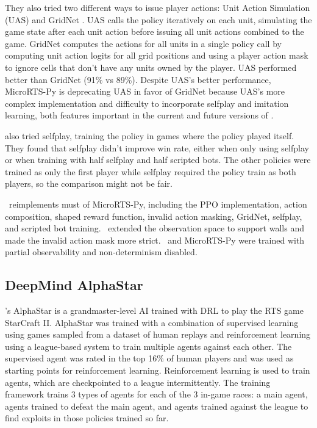 \documentclass{article}
\begin{document}
They also tried two different ways to issue player actions: Unit Action Simulation (UAS)
and GridNet \citep{pmlr-v97-han19a}. UAS calls the policy iteratively on each unit, simulating the game state
after each unit action before issuing all unit actions combined to the game. GridNet
computes the actions for all units in a single policy call by computing unit action
logits for all grid positions and using a player action mask to ignore cells that don't
have any units owned by the player. UAS performed better than GridNet (91\% vs 89\%).
Despite UAS's better performance, MicroRTS-Py is deprecating UAS in favor of GridNet
because UAS's more complex implementation and difficulty to incorporate selfplay and
imitation learning, both features important in the current and future versions of
\agentName.

\citet{DBLP:journals/corr/abs-2105-13807} also tried selfplay, training the policy in
games where the policy played itself. They found that selfplay didn't improve win rate,
either when only using selfplay or when training with half selfplay and half scripted
bots. The other policies were trained as only the first player while selfplay required
the policy train as both players, so the comparison might not be fair.

\agentName\ reimplements must of MicroRTS-Py, including the PPO implementation, action
composition, shaped reward function, invalid action masking, GridNet, selfplay, and
scripted bot training. \agentName\ extended the observation space to support walls and
made the invalid action mask more strict. \agentName\ and MicroRTS-Py were trained with partial
observability and non-determinism disabled.

\subsection{DeepMind AlphaStar}
\citet{Vinyals2019GrandmasterLI}'s AlphaStar is a grandmaster-level AI trained with DRL to play the RTS game
StarCraft II. AlphaStar was trained with a combination of supervised learning using
games sampled from a dataset of human replays and reinforcement learning using a
league-based system to train multiple agents against each other. The supervised agent
was rated in the top 16\% of human players and was used as starting points for
reinforcement learning. Reinforcement learning is used to train agents, which are
checkpointed to a league intermittently. The training framework trains 3 types of agents
for each of the 3 in-game races: a main agent, agents trained to defeat the main agent, and agents
trained against the league to find exploits in those policies trained so far.
\end{document}
